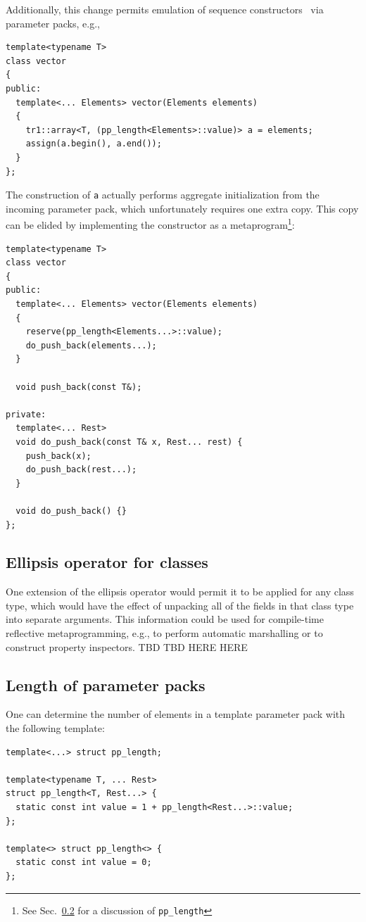 \documentclass{article}
\begin{document}
Additionally, this change permits emulation of sequence
constructors~\cite{DoReStr03} via parameter packs, e.g.,
\begin{verbatim}
template<typename T>
class vector
{
public:
  template<... Elements> vector(Elements elements)
  {
    tr1::array<T, (pp_length<Elements>::value)> a = elements;
    assign(a.begin(), a.end());
  }
};
\end{verbatim}

The construction of \texttt{a} actually performs aggregate
initialization from the incoming parameter pack, which unfortunately
requires one extra copy. This copy can be elided by implementing the
constructor as a metaprogram\footnote{See Sec.~\ref{sec:pp-size} for a
  discussion of \texttt{pp\_length}}:

\begin{verbatim}
template<typename T>
class vector
{
public:
  template<... Elements> vector(Elements elements)
  {
    reserve(pp_length<Elements...>::value);
    do_push_back(elements...);
  }

  void push_back(const T&);

private:
  template<... Rest>
  void do_push_back(const T& x, Rest... rest) {
    push_back(x);
    do_push_back(rest...);
  }

  void do_push_back() {}
};
\end{verbatim}

\subsection{Ellipsis operator for classes}
One extension of the ellipsis operator would permit it to be applied
for any class type, which would have the effect of unpacking all of
the fields in that class type into separate arguments. This
information could be used for compile-time reflective metaprogramming,
e.g., to perform automatic marshalling or to construct property
inspectors. TBD TBD HERE HERE


\subsection{Length of parameter packs}
\label{sec:pp-size}
One can determine the number of elements in a template parameter pack
with the following template:
\begin{verbatim}
template<...> struct pp_length;

template<typename T, ... Rest>
struct pp_length<T, Rest...> {
  static const int value = 1 + pp_length<Rest...>::value; 
};

template<> struct pp_length<> {
  static const int value = 0;
};
\end{verbatim}
\end{document}
